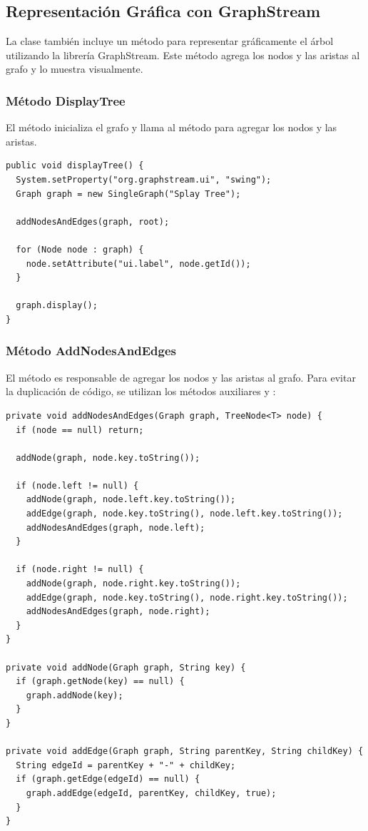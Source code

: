 \subsection{Representación Gráfica con GraphStream}
La clase  también incluye un método para representar gráficamente el árbol utilizando la librería GraphStream. Este método agrega los nodos y las aristas al grafo y lo muestra visualmente.

\subsubsection{Método DisplayTree}
El método  inicializa el grafo y llama al método  para agregar los nodos y las aristas.
\begin{verbatim}
public void displayTree() {
  System.setProperty("org.graphstream.ui", "swing");
  Graph graph = new SingleGraph("Splay Tree");

  addNodesAndEdges(graph, root);

  for (Node node : graph) {
    node.setAttribute("ui.label", node.getId());
  }

  graph.display();
}
\end{verbatim}

\subsubsection{Método AddNodesAndEdges}
El método  es responsable de agregar los nodos y las aristas al grafo. Para evitar la duplicación de código, se utilizan los métodos auxiliares  y :
\begin{verbatim}
private void addNodesAndEdges(Graph graph, TreeNode<T> node) {
  if (node == null) return;

  addNode(graph, node.key.toString());

  if (node.left != null) {
    addNode(graph, node.left.key.toString());
    addEdge(graph, node.key.toString(), node.left.key.toString());
    addNodesAndEdges(graph, node.left);
  }

  if (node.right != null) {
    addNode(graph, node.right.key.toString());
    addEdge(graph, node.key.toString(), node.right.key.toString());
    addNodesAndEdges(graph, node.right);
  }
}

private void addNode(Graph graph, String key) {
  if (graph.getNode(key) == null) {
    graph.addNode(key);
  }
}

private void addEdge(Graph graph, String parentKey, String childKey) {
  String edgeId = parentKey + "-" + childKey;
  if (graph.getEdge(edgeId) == null) {
    graph.addEdge(edgeId, parentKey, childKey, true);
  }
}
\end{verbatim}

